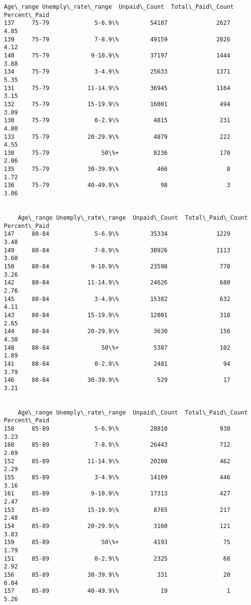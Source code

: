 \documentclass[11pt]{article}
\begin{document}
\begin{Verbatim}[commandchars=\\\{\}]
    Age\_range Unemply\_rate\_range  Unpaid\_Count  Total\_Paid\_Count  Percent\_Paid
137     75-79             5-6.9\%         54187              2627          4.85
139     75-79             7-8.9\%         49159              2026          4.12
140     75-79            9-10.9\%         37197              1444          3.88
134     75-79             3-4.9\%         25633              1371          5.35
131     75-79           11-14.9\%         36945              1164          3.15
132     75-79           15-19.9\%         16001               494          3.09
130     75-79             0-2.9\%          4815               231          4.80
133     75-79           20-29.9\%          4879               222          4.55
138     75-79               50\%+          8236               170          2.06
135     75-79           30-39.9\%           466                 8          1.72
136     75-79           40-49.9\%            98                 3          3.06


    Age\_range Unemply\_rate\_range  Unpaid\_Count  Total\_Paid\_Count  Percent\_Paid
147     80-84             5-6.9\%         35334              1229          3.48
149     80-84             7-8.9\%         30926              1113          3.60
150     80-84            9-10.9\%         23598               770          3.26
142     80-84           11-14.9\%         24626               680          2.76
145     80-84             3-4.9\%         15382               632          4.11
143     80-84           15-19.9\%         12001               318          2.65
144     80-84           20-29.9\%          3630               156          4.30
148     80-84               50\%+          5387               102          1.89
141     80-84             0-2.9\%          2481                94          3.79
146     80-84           30-39.9\%           529                17          3.21


    Age\_range Unemply\_rate\_range  Unpaid\_Count  Total\_Paid\_Count  Percent\_Paid
158     85-89             5-6.9\%         28810               930          3.23
160     85-89             7-8.9\%         26443               712          2.69
152     85-89           11-14.9\%         20208               462          2.29
155     85-89             3-4.9\%         14109               446          3.16
161     85-89            9-10.9\%         17313               427          2.47
153     85-89           15-19.9\%          8765               217          2.48
154     85-89           20-29.9\%          3160               121          3.83
159     85-89               50\%+          4193                75          1.79
151     85-89             0-2.9\%          2325                68          2.92
156     85-89           30-39.9\%           331                20          6.04
157     85-89           40-49.9\%            19                 1          5.26



\end{Verbatim}
\end{document}
